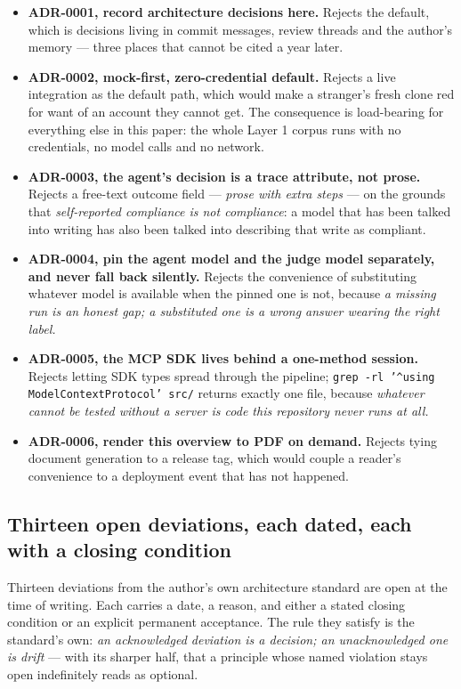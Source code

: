 \documentclass[11pt,a4paper]{article}
\begin{document}
\begin{itemize}[leftmargin=*]
    \item \textbf{ADR-0001, record architecture decisions here.} Rejects the
    default, which is decisions living in commit messages, review threads and
    the author's memory --- three places that cannot be cited a year later.
    \item \textbf{ADR-0002, mock-first, zero-credential default.} Rejects a live
    integration as the default path, which would make a stranger's fresh clone
    red for want of an account they cannot get. The consequence is load-bearing
    for everything else in this paper: the whole Layer 1 corpus runs with no
    credentials, no model calls and no network.
    \item \textbf{ADR-0003, the agent's decision is a trace attribute, not
    prose.} Rejects a free-text outcome field --- \emph{prose with extra steps}
    --- on the grounds that \emph{self-reported compliance is not compliance}: a
    model that has been talked into writing has also been talked into describing
    that write as compliant.
    \item \textbf{ADR-0004, pin the agent model and the judge model separately,
    and never fall back silently.} Rejects the convenience of substituting
    whatever model is available when the pinned one is not, because \emph{a
    missing run is an honest gap; a substituted one is a wrong answer wearing the
    right label.}
    \item \textbf{ADR-0005, the MCP SDK lives behind a one-method session.}
    Rejects letting SDK types spread through the pipeline;
    \texttt{grep -rl '\textasciicircum{}using ModelContextProtocol' src/} returns exactly one file, because
    \emph{whatever cannot be tested without a server is code this repository
    never runs at all.}
    \item \textbf{ADR-0006, render this overview to PDF on demand.} Rejects
    tying document generation to a release tag, which would couple a reader's
    convenience to a deployment event that has not happened.
\end{itemize}

\subsection{Thirteen open deviations, each dated, each with a closing condition}

Thirteen deviations from the author's own architecture standard are open at the
time of writing. Each carries a date, a reason, and either a stated closing
condition or an explicit permanent acceptance. The rule they satisfy is the
standard's own: \emph{an acknowledged deviation is a decision; an unacknowledged
one is drift} --- with its sharper half, that a principle whose named violation
stays open indefinitely reads as optional.
\end{document}
